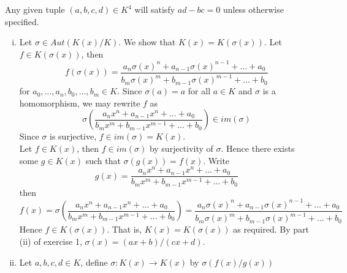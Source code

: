 \begin{solution} 
	Any given tuple $(a,b,c,d) \in K^4$ will satisfy $ad - bc = 0$ 
	unless otherwise specified.
	\begin{enumerate}[(i)]
		\item Let $\sigma \in Aut(K(x)/K)$. We show that $K(x) = K(\sigma(x)) $. 
		Let $f \in K(\sigma(x))$, then 
		$$
		f(\sigma(x)) = \frac{a_n\sigma(x)^n + a_{n-1}\sigma(x)^{n-1} + ... + a_0 }{b_m\sigma(x)^m + b_{m-1}\sigma(x)^{m-1} + ... + b_0 } 
		$$ 
		for $a_0,...,a_n,b_0,...,b_m \in K$. Since $\sigma(a) = a $ 
		for all $a \in K$ and $\sigma$ is a homomorphism, we may 
		rewrite $f$ as $$\sigma (\frac{a_nx^n + a_{n-1}x^n + ... + a _0}{b_mx^m + b_{m-1}x^{m-1} + ... + b_0}) \in im(\sigma)$$ 
		Since $\sigma$ is surjective, $f \in im(\sigma) = K(x)$. \\

		Let $f \in K(x)$, then $f \in im(\sigma)$ by surjectivity of $\sigma$. 
		Hence there exists some $g\in K(x)$ such that $\sigma(g(x)) = f(x)$.
		Write $$g(x) = \frac{a_nx^n + a_{n-1}x^n + ... + a _0}{b_mx^m + b_{m-1}x^{m-1} + ... + b_0}$$ 
		then $$
		f(x)= \sigma(\frac{a_nx^n + a_{n-1}x^n + ... + a _0}{b_mx^m + b_{m-1}x^{m-1} + ... + b_0}) 
		= \frac{a_n\sigma(x)^n + a_{n-1}\sigma(x)^{n-1} + ... + a_0 }{b_m\sigma(x)^m + b_{m-1}\sigma(x)^{m-1} + ... + b_0 } 
		$$ 
		Hence $f \in K(\sigma(x))$. That is, $K(x) = K(\sigma(x))$ as required.
		By part (ii) of exercise 1, $\sigma(x) = (ax+b)/(cx+d)$.

		\item Let $a,b,c,d \in K$, define $\sigma : K(x) \longrightarrow K(x) $ by $\sigma(f(x)/g(x))$ 


\end{enumerate}
\end{solution}
